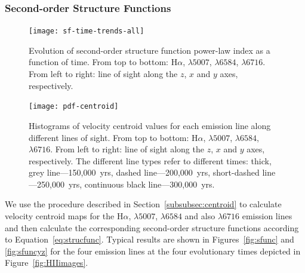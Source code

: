 \documentclass[useAMS,usenatbib]{mn2e}
\begin{document}
\subsubsection{Second-order Structure Functions}
\label{sssec:s2func}
  \begin{figure}
  \centering
  \texttt{[image: sf-time-trends-all]}
  \caption{Evolution of second-order structure function power-law
    index as a function of time. From top to bottom:   H$\alpha$, \oiii$\lambda 5007$, \nii$\lambda 6584$, \sii$\lambda
  6716$. From left to right: line of sight along the $z$, $x$ and $y$
  axes, respectively.}
  \label{fig:sftrends}
  \end{figure}
\begin{figure}
\centering
\texttt{[image: pdf-centroid]}
\caption{Histograms of velocity centroid values for each emission line
  along different lines of sight. From top to bottom:
  H$\alpha$, \oiii$\lambda 5007$, \nii$\lambda 6584$, \sii$\lambda
  6716$. From left to right: line of sight along the $z$, $x$ and $y$
  axes, respectively. The different line types refer to different
  times: thick, grey line---150,000~yrs, dashed line---200,000~yrs,
  short-dashed line---250,000~yrs, continuous black line---300,000~yrs.} 
\label{fig:histogram}
\end{figure}
We use the procedure described in Section~\ref{subsubsec:centroid} to
calculate velocity centroid maps for the H$\alpha$, \oiii$\lambda
5007$, \nii$\lambda 6584$ and also \sii$\lambda 6716$ emission lines
and then calculate the corresponding second-order structure functions
according to Equation~\ref{eq:strucfunc}. Typical results are shown in
Figures~\ref{fig:sfunc} and \ref{fig:sfuncyz} for the four emission lines at the four 
evolutionary times depicted in Figure~\ref{fig:HIIimages}.
\end{document}
